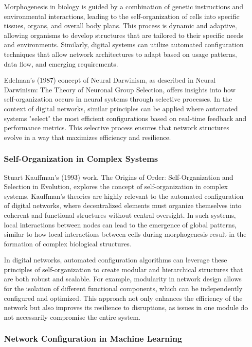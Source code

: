 \documentclass[12pt,twoside]{article}
\begin{document}
Morphogenesis in biology is guided by a combination of genetic instructions and environmental interactions, leading to the self-organization of cells into specific tissues, organs, and overall body plans. This process is dynamic and adaptive, allowing organisms to develop structures that are tailored to their specific needs and environments. Similarly, digital systems can utilize automated configuration techniques that allow network architectures to adapt based on usage patterns, data flow, and emerging requirements.

Edelman’s (1987) concept of Neural Darwinism, as described in Neural Darwinism: The Theory of Neuronal Group Selection, offers insights into how self-organization occurs in neural systems through selective processes. In the context of digital networks, similar principles can be applied where automated systems "select" the most efficient configurations based on real-time feedback and performance metrics. This selective process ensures that network structures evolve in a way that maximizes efficiency and resilience.

\subsubsection{Self-Organization in Complex Systems}

Stuart Kauffman’s (1993) work, The Origins of Order: Self-Organization and Selection in Evolution, explores the concept of self-organization in complex systems. Kauffman’s theories are highly relevant to the automated configuration of digital networks, where decentralized elements must organize themselves into coherent and functional structures without central oversight. In such systems, local interactions between nodes can lead to the emergence of global patterns, similar to how local interactions between cells during morphogenesis result in the formation of complex biological structures.

In digital networks, automated configuration algorithms can leverage these principles of self-organization to create modular and hierarchical structures that are both robust and scalable. For example, modularity in network design allows for the isolation of different functional components, which can be independently configured and optimized. This approach not only enhances the efficiency of the network but also improves its resilience to disruptions, as issues in one module do not necessarily compromise the entire system.


\subsubsection{Network Configuration in Machine Learning}
\end{document}

